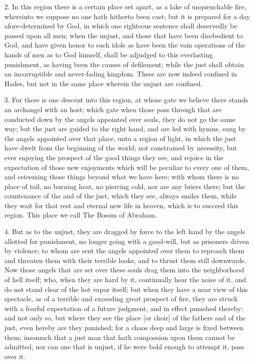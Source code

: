 2. In this region there is a certain place set apart, as a lake of
unquenchable fire, whereinto we suppose no one hath hitherto been cast;
but it is prepared for a day afore-determined by God, in which one
righteous sentence shall deservedly be passed upon all men; when the
unjust, and those that have been disobedient to God, and have given honor
to such idols as have been the vain operations of the hands of men as to
God himself, shall be adjudged to this everlasting punishment, as having
been the causes of defilement; while the just shall obtain an
incorruptible and never-fading kingdom. These are now indeed confined in
Hades, but not in the same place wherein the unjust are confined.

3. For there is one descent into this region, at whose gate we believe
there stands an archangel with an host; which gate when those pass through
that are conducted down by the angels appointed over souls, they do not go
the same way; but the just are guided to the right hand, and are led with
hymns, sung by the angels appointed over that place, unto a region of
light, in which the just have dwelt from the beginning of the world; not
constrained by necessity, but ever enjoying the prospect of the good
things they see, and rejoice in the expectation of those new enjoyments
which will be peculiar to every one of them, and esteeming those things
beyond what we have here; with whom there is no place of toil, no burning
heat, no piercing cold, nor are any briers there; but the countenance of
the and of the just, which they see, always smiles them, while they wait
for that rest and eternal new life in heaven, which is to succeed this
region. This place we call The Bosom of Abraham.

4. But as to the unjust, they are dragged by force to the left hand by the
angels allotted for punishment, no longer going with a good-will, but as
prisoners driven by violence; to whom are sent the angels appointed over
them to reproach them and threaten them with their terrible looks, and to
thrust them still downwards. Now those angels that are set over these
souls drag them into the neighborhood of hell itself; who, when they are
hard by it, continually hear the noise of it, and do not stand clear of
the hot vapor itself; but when they have a near view of this spectacle, as
of a terrible and exceeding great prospect of fire, they are struck with a
fearful expectation of a future judgment, and in effect punished thereby:
and not only so, but where they see the place [or choir] of the fathers
and of the just, even hereby are they punished; for a chaos deep and large
is fixed between them; insomuch that a just man that hath compassion upon
them cannot be admitted, nor can one that is unjust, if he were bold
enough to attempt it, pass over it.

